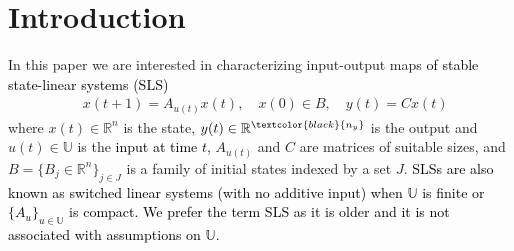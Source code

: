 \documentclass[journal,twoside,web]{ieeecolor}
\begin{document}
\section{Introduction}
In this paper we are interested in characterizing input-output maps
\textcolor{black}{of stable \textcolor{black}{state-linear} systems (SLS)} %
\begin{equation}
    \label{eq1} 
       \begin{split}
         &  x(t+1)=A_{u(t)}x(t), \quad x(0) \in B, \quad  y(t)=C x(t)
      \end{split}
\end{equation}
where $x(t) \in \mathbb{R}^n$ is the state, $y(t) \in \mathbb{R}^{\textcolor{black}{n_y}}$ is the output and $u(t) \in \mathbb{U}$ is the 
\textcolor{black}{input at time $t$}, $A_{u(t)}$ and $C$ are matrices of suitable sizes,
   and $B=\{B_j \in \mathbb{R}^n\}_{j \in J}$
   is a family of initial states indexed by a set $J$.
  \textcolor{black}{SLSs are also known as switched linear systems (with no additive input) when $\mathbb{U}$ is finite or $\{A_u\}_{u \in \mathbb{U}}$ is compact. We prefer the term SLS as it is older \cite{Son:Real} and it is not associated with 
  assumptions on $\mathbb{U}$.}
\end{document}
